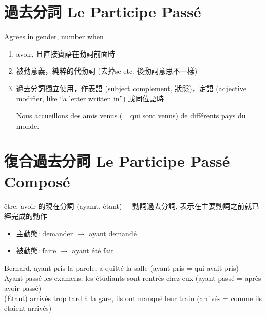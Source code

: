 \documentclass{book}
\begin{document}
    \section{過去分詞 Le Participe Passé}
        Agrees in gender, number when
        \begin{enumerate}
            \item avoir, 且直接賓語在動詞前面時
            \item 被動意義，純粹的代動詞 (去掉se etc. 後動詞意思不一樣)
            \item 過去分詞獨立使用，作表語 (subject complement, 狀態)，定語 (adjective modifier, like ``a letter written in'') 或同位語時
                \begin{center}
                    Nous accueillons des amis venus (= qui sont venus) de différents pays du monde.
                \end{center}
        \end{enumerate}

    \section{復合過去分詞 Le Participe Passé Composé}
        être, avoir 的現在分詞 (ayamt, étant) + 動詞過去分詞, 表示在主要動詞之前就已經完成的動作
            \begin{itemize}
                \item 主動態: demander $\to$ ayant demandé
                \item 被動態: faire $\to$ ayant été fait
            \end{itemize}
            \begin{center}
                Bernard, ayant pris la parole, a quitté la salle (ayant pris = qui avait pris) 
                \\
                Ayant passé les examens, les étudiants sont rentrés chez eux (ayant passé = après avoir passé)
                \\
                (Étant) arrivés trop tard à la gare, ils ont manqué leur train (arrivés = comme ils étaient arrivés)
            \end{center}
\end{document}
